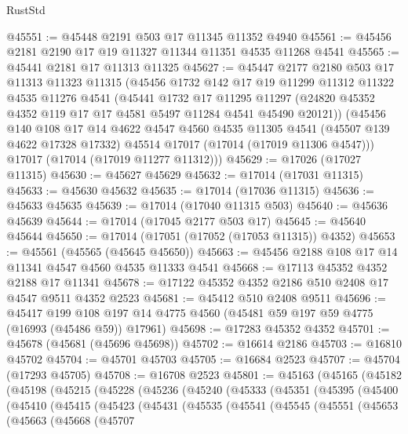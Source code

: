 \begin{lexlean}{RustStd}
\begin{coremodule}
@45551 := @45448 @2191 @503 @17 @11345 @11352 @4940
@45561 := @45456 @2181 @2190 @17 @19 @11327 @11344 @11351 @4535 @11268 @4541
@45565 := @45441 @2181 @17 @11313 @11325
@45627 := @45447
    @2177
    @2180
    @503
    @17
    @11313
    @11323
    @11315
    (@45456
      @1732
      @142
      @17
      @19
      @11299
      @11312
      @11322
      @4535
      @11276
      @4541
      (@45441
        @1732
        @17
        @11295
        @11297
        (@24820 @45352 @4352 @119 @17 @17 @4581 @5497 @11284 @4541 @45490 @20121))
      (@45456
        @140
        @108
        @17
        @14
        @4622
        @4547
        @4560
        @4535
        @11305
        @4541
        (@45507 @139 @4622 @17328 @17332)
        @45514
        @17017
        (@17014 (@17019 @11306 @4547)))
      @17017
      (@17014 (@17019 @11277 @11312)))
@45629 := @17026 (@17027 @11315)
@45630 := @45627 @45629
@45632 := @17014 (@17031 @11315)
@45633 := @45630 @45632
@45635 := @17014 (@17036 @11315)
@45636 := @45633 @45635
@45639 := @17014 (@17040 @11315 @503)
@45640 := @45636 @45639
@45644 := @17014 (@17045 @2177 @503 @17)
@45645 := @45640 @45644
@45650 := @17014 (@17051 (@17052 (@17053 @11315)) @4352)
@45653 := @45561 (@45565 (@45645 @45650))
@45663 := @45456 @2188 @108 @17 @14 @11341 @4547 @4560 @4535 @11333 @4541
@45668 := @17113 @45352 @4352 @2188 @17 @11341
@45678 := @17122 @45352 @4352 @2186 @510 @2408 @17 @4547 @9511 @4352 @2523
@45681 := @45412 @510 @2408 @9511
@45696 := @45417
    @199
    @108
    @197
    @14
    @4775
    @4560
    (@45481 @59 @197 @59 @4775 (@16993 (@45486 @59)) @17961)
@45698 := @17283 @45352 @4352
@45701 := @45678 (@45681 (@45696 @45698))
@45702 := @16614 @2186
@45703 := @16810 @45702
@45704 := @45701 @45703
@45705 := @16684 @2523
@45707 := @45704 (@17293 @45705)
@45708 := @16708 @2523
@45801 := @45163
    (@45165
      (@45182
        (@45198
          (@45215
            (@45228
              (@45236
                (@45240
                  (@45333
                    (@45351
                      (@45395
                        (@45400
                          (@45410
                            (@45415
                              (@45423
                                (@45431
                                  (@45535
                                    (@45541
                                      (@45545
                                        (@45551
                                          (@45653
                                            (@45663
                                              (@45668
                                                (@45707

\end{coremodule}
\end{lexlean}
